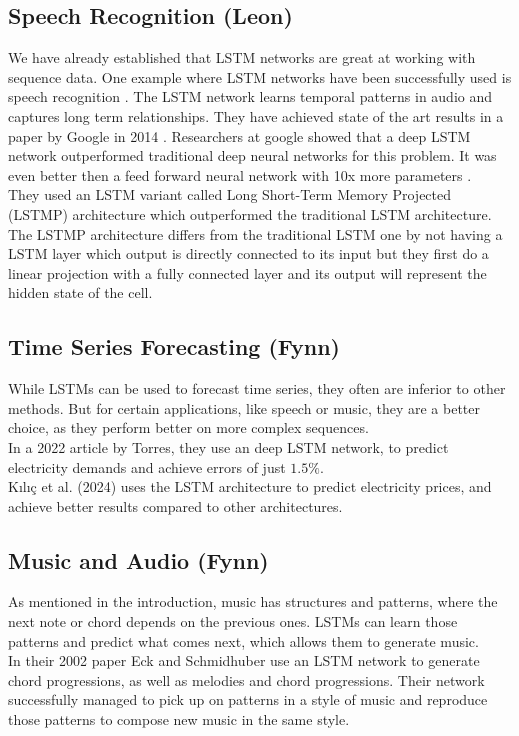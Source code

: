 \documentclass[twoside,a4paper,10pt,DIV=12,BCOR=12mm]{scrartcl}
\begin{document}
\subsection{Speech Recognition (Leon)}

We have already established that LSTM networks are great at working with sequence data. One example where LSTM networks
have been successfully used is speech recognition \cite{Graves04}. The LSTM network learns temporal patterns in audio and captures long 
term relationships. They have achieved state of the art results in a paper by Google in 2014 \cite{sak2014longshorttermmemorybased}.
Researchers at google showed that a deep LSTM network outperformed traditional deep neural networks for this problem.
It was even better then a feed forward neural network with 10x more parameters \cite{sak2014longshorttermmemorybased}.\\


They used an LSTM variant called Long Short-Term Memory Projected (LSTMP) architecture \cite{sak2014longshorttermmemorybased} which
outperformed the traditional LSTM architecture. The LSTMP architecture differs from the traditional LSTM one by not having a LSTM layer
which output is directly connected to its input but they first do a linear projection with a fully connected layer and its output will represent the 
hidden state of the cell.

\subsection{Time Series Forecasting (Fynn)}
While LSTMs can be used to forecast time series, they often are inferior to other methods.\cite{gers2001timeseries} But for certain applications, like speech or music, they are a better choice, as they perform better on more complex sequences.\cite{gers2001timeseries, cahuantzi2023lstmvsgru}\\
In a 2022 article by Torres, they use an deep LSTM network, to predict electricity demands and achieve errors of just \begin{math}1.5\%\end{math}.\cite{torres2022elctricityforecasting}\\
Kılıç et al. (2024) uses the LSTM architecture to predict electricity prices, and achieve better results compared to other architectures.\cite{nielsen2024electricitypriceforcasting}

\subsection{Music and Audio (Fynn)}
As mentioned in the introduction, music has structures and patterns, where the next note or chord depends on the previous ones. LSTMs can learn those patterns and predict what comes next, which allows them to generate music.\cite{eck2002musicgeneration}\\
In their 2002 paper Eck and Schmidhuber use an LSTM network to generate chord progressions, as well as melodies and chord progressions. Their network successfully managed to pick up on patterns in a style of music and reproduce those patterns to compose new music in the same style.\cite{eck2002musicgeneration}  
\end{document}
